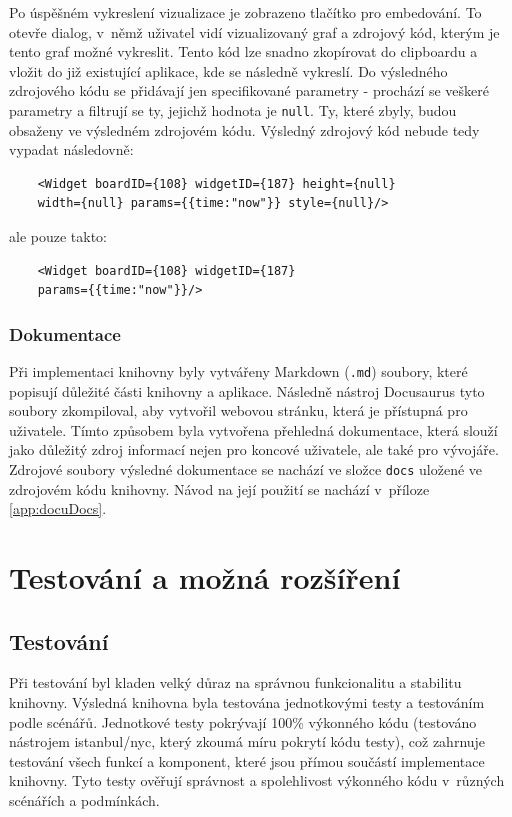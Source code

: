 \documentclass[czech, bc, kiv, he, iso690numb]{fasthesis}
\begin{document}
Po úspěšném vykreslení vizualizace je zobrazeno tlačítko pro embedování. To otevře dialog, v~němž uživatel vidí vizualizovaný graf a zdrojový kód, kterým je tento graf možné vykreslit.
Tento kód lze snadno zkopírovat do clipboardu a vložit do již existující aplikace, kde se následně vykreslí. Do výsledného zdrojového kódu se přidávají jen specifikované parametry -
prochází se veškeré parametry a filtrují se ty, jejichž hodnota je \texttt{null}. Ty, které zbyly, budou obsaženy ve výsledném zdrojovém kódu. Výsledný zdrojový kód nebude tedy vypadat následovně:
\begin{lstlisting}
	<Widget boardID={108} widgetID={187} height={null}
	width={null} params={{time:"now"}} style={null}/>
\end{lstlisting}
ale pouze takto:
\begin{lstlisting}
	<Widget boardID={108} widgetID={187} 
	params={{time:"now"}}/>
\end{lstlisting}

\subsection{Dokumentace}

Při implementaci knihovny byly vytvářeny Markdown (\texttt{.md}) soubory, které popisují důležité části knihovny a aplikace. Následně nástroj Docusaurus tyto soubory zkompiloval,
aby vytvořil webovou stránku, která je přístupná pro uživatele. Tímto způsobem byla vytvořena přehledná dokumentace, která slouží jako důležitý zdroj informací nejen pro koncové uživatele,
ale také pro vývojáře. Zdrojové soubory výsledné dokumentace se nachází ve složce \texttt{docs} uložené ve zdrojovém kódu knihovny. Návod na její použití se nachází v~příloze \ref{app:docuDocs}.

\chapter{Testování a možná rozšíření}
\section{Testování}
Při testování byl kladen velký důraz na správnou funkcionalitu a stabilitu knihovny. Výsledná knihovna byla testována jednotkovými testy a testováním podle
scénářů. Jednotkové testy pokrývají 100\% výkonného kódu (testováno nástrojem istanbul/nyc, který zkoumá míru pokrytí kódu testy), což zahrnuje testování všech funkcí a komponent, 
které jsou přímou součástí implementace knihovny.
Tyto testy ověřují správnost a spolehlivost výkonného kódu v~různých scénářích a podmínkách.
\end{document}

